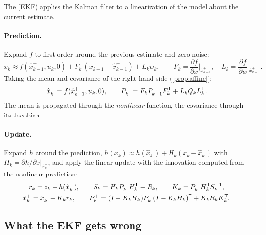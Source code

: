 The  (EKF) applies the Kalman filter to a linearization of the model about the current estimate.

\paragraph{Prediction.} Expand $f$ to first order around the previous estimate and zero noise:
\begin{equation}
  x_k \approx f(\hat x_{k-1}^+, u_k, 0) + F_k\,(x_{k-1} - \hat x_{k-1}^+) + L_kw_k,
  \qquad F_k = \frac{\partial f}{\partial x}\Big|_{\hat x_{k-1}^+},\quad L_k = \frac{\partial f}{\partial w}\Big|_{\hat x_{k-1}^+} .
\end{equation}
Taking the mean and covariance of the right-hand side (\cref{prop:affine}):
\begin{equation}
  \hat x_k^- = f(\hat x_{k-1}^+, u_k, 0), \qquad P_k^- = F_kP_{k-1}^+F_k^{\mathsf{T}} + L_kQ_kL_k^{\mathsf{T}} .
\end{equation}
The mean is propagated through the \emph{nonlinear} function, the covariance through its Jacobian.

\paragraph{Update.} Expand $h$ around the prediction, $h(x_k) \approx h(\hat x_k^-) + H_k(x_k - \hat x_k^-)$ with $H_k = \partial h/\partial x|_{\hat x_k^-}$, and apply the linear update with
the innovation computed from the nonlinear prediction:
\begin{equation}
\begin{gathered}
  r_k = z_k - h(\hat x_k^-), \qquad S_k = H_kP_k^-H_k^{\mathsf{T}} + R_k, \qquad K_k = P_k^-H_k^{\mathsf{T}} S_k^{-1}, \\
  \hat x_k^+ = \hat x_k^- + K_kr_k, \qquad P_k^+ = (I - K_kH_k)P_k^-(I - K_kH_k)^{\mathsf{T}} + K_kR_kK_k^{\mathsf{T}} .
\end{gathered}
\end{equation}

\subsection{What the EKF gets wrong}

